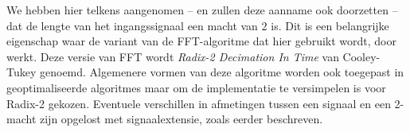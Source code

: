 \begin{opmerk}
We hebben hier telkens aangenomen -- en zullen deze aanname ook doorzetten -- 
dat de lengte van het ingangssignaal een macht van $2$ is. Dit is een belangrijke
eigenschap waar de variant van de FFT-algoritme dat hier gebruikt wordt, door werkt. Deze versie van FFT wordt
 \emph{Radix-2 Decimation In Time} van Cooley-Tukey genoemd. Algemenere vormen van deze algoritme
worden ook toegepast in geoptimaliseerde algoritmes maar om de implementatie te versimpelen 
is voor Radix-2 gekozen. Eventuele verschillen in afmetingen tussen een signaal en 
een 2-macht zijn opgelost met signaalextensie, zoals eerder beschreven.
\end{opmerk}

